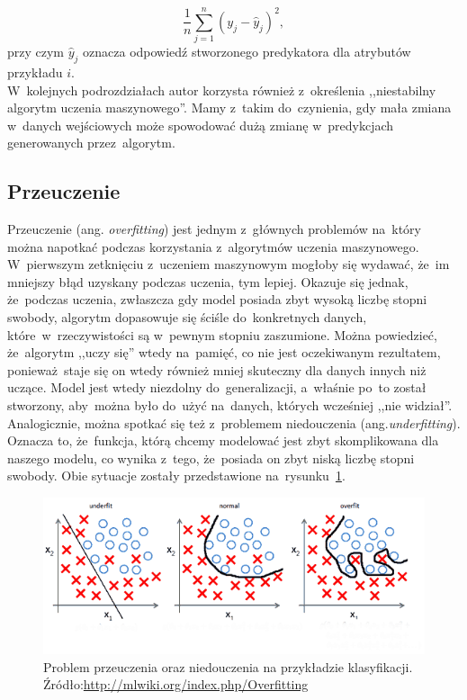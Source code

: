 \begin{equation}
\frac{1}{n} \sum_{j=1}^{n}(y_j - \hat{y}_j)^{2}, 
\end{equation}
przy czym $\hat{y}_j$ oznacza odpowiedź stworzonego predykatora dla atrybutów przykładu $i$.\\
W~kolejnych podrozdziałach autor korzysta również z~określenia ,,niestabilny algorytm uczenia maszynowego''. Mamy z~takim do~czynienia, gdy mała zmiana w~danych wejściowych może spowodować dużą zmianę w~predykcjach generowanych przez~algorytm\cite{ensemble}.

\subsection{Przeuczenie}\label{overfitting_section}
Przeuczenie (ang. \textit{overfitting}) jest jednym z~głównych problemów na~który można napotkać podczas korzystania z~algorytmów uczenia maszynowego. W~pierwszym zetknięciu z~uczeniem maszynowym mogłoby się wydawać, że~im mniejszy błąd uzyskany podczas uczenia, tym lepiej. Okazuje się jednak, że~podczas uczenia, zwłaszcza gdy model posiada zbyt wysoką liczbę stopni swobody, algorytm dopasowuje się ściśle do~konkretnych danych, które~w~rzeczywistości są w~pewnym stopniu zaszumione. Można powiedzieć, że~algorytm ,,uczy się'' wtedy na~pamięć, co nie jest oczekiwanym rezultatem, ponieważ~staje się on wtedy również mniej skuteczny dla danych innych niż uczące.  Model jest wtedy niezdolny do~generalizacji, a~właśnie po~to został stworzony, aby~można było do~użyć na~danych, których wcześniej ,,nie widział''. Analogicznie, można spotkać się też z~problemem niedouczenia (ang.\textit{underfitting}). Oznacza to, że~funkcja, którą chcemy modelować jest zbyt skomplikowana dla naszego modelu, co wynika z~tego, że~posiada on zbyt niską liczbę stopni swobody. Obie sytuacje zostały przedstawione na~rysunku~\ref{overfitting}.

\begin{figure}[ht!]
\centering
\includegraphics[scale=0.8]{res/overfitting.png}
\caption[Caption for LOF]{Problem przeuczenia oraz niedouczenia na przykładzie klasyfikacji. Źródło:\url{http://mlwiki.org/index.php/Overfitting}\label{overfitting}} 
\end{figure}

